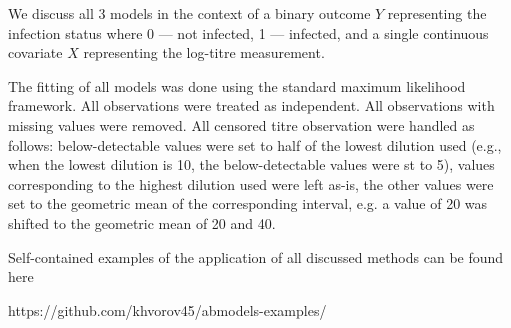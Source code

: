 We discuss all 3 models in the context of a binary outcome $Y$ representing the infection status where 0 --- not infected, 1 --- infected, and a single continuous covariate $X$ representing the log-titre measurement.

The fitting of all models was done using the standard maximum likelihood framework. All observations were treated as independent. All observations with missing values were removed. All censored titre observation were handled as follows: below-detectable values were set to half of the lowest dilution used (e.g., when the lowest dilution is 10, the below-detectable values were st to 5), values corresponding to the highest dilution used were left as-is, the other values were set to the geometric mean of the corresponding interval, e.g. a value of 20 was shifted to the geometric mean of 20 and 40.

Self-contained examples of the application of all discussed methods can be found here

https://github.com/khvorov45/abmodels-examples/

